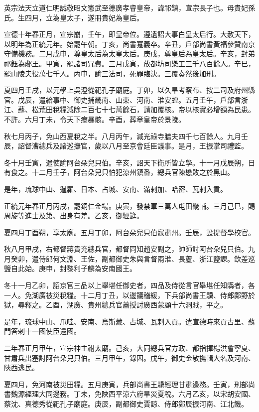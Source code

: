 
\begin{pinyinscope}
英宗法天立道仁明誠敬昭文憲武至德廣孝睿皇帝，諱祁鎮，宣宗長子也。母貴妃孫氏。生四月，立為皇太子，遂冊貴妃為皇后。

宣德十年春正月，宣宗崩，壬午，即皇帝位。遵遺詔大事白皇太后行。大赦天下，以明年為正統元年。始罷午朝。丁亥，尚書蹇義卒。辛丑，戶部尚書黃福參贊南京守備機務。二月戊申，尊皇太后為太皇太后。庚戌，尊皇后為皇太后。辛亥，封弟祁鈺為郕王。甲寅，罷諸司冗費。三月戊寅，放都坊司樂工三千八百餘人。辛巳，罷山陵夫役萬七千人。丙申，諭三法司，死罪臨決。三覆奏然後加刑。

夏四月壬戌，以元學上吳澄從祀孔子廟庭。丁卯，以久旱考察布、按二司及府州縣官。戊辰，遣給事中、御史捕畿南、山東、河南、淮安蝗。五月壬午，戶部言浙江、蘇、松荒田稅糧減除二百七十七萬餘石，請加覆核。帝以核實必增額為民患。不許。六月丁未，令天下瘞暴骸。辛酉，葬章皇帝於景陵。

秋七月丙子，免山西夏稅之半。八月丙午，減光祿寺膳夫四千七百餘人。九月壬辰，詔督漕總兵及諸巡撫官，歲以八月至京會廷臣議事。是月，王振掌司禮監。

冬十月壬寅，遣使諭阿台朵兒只伯。辛亥，詔天下衛所皆立學。十一月戊辰朔，日有食之。十二月壬子，阿台朵兒只怕犯涼州鎮番，總兵官陳懋敗之於黑山。

是年，琉球中山、暹羅、日本、占城、安南、滿剌加、哈密、瓦剌入貢。

正統元年春正月丙戌，罷銅仁金場。庚寅，發禁軍三萬人屯田畿輔。三月己巳，賜周旋等進士及第、出身有差。乙亥，御經筵。

夏四月丁酉朔，享太廟。五月丁卯，阿台朵兒只伯寇肅州。壬辰，設提督學校官。

秋八月甲戌，右都督蔣貴充總兵官，都督同知趙安副之，帥師討阿台朵兒只伯。九月癸卯，遣侍郎何文淵、王佐，副都御史朱與言督兩淮、長蘆、浙江鹽課。欽差巡鹽自此始。庚申，封黎利子麟為安南國王。

冬十一月乙卯，詔京官三品以上舉堪任御史者，四品及侍從言官舉堪任知縣者，各一人。免湖廣被災稅糧。十二月丁丑，以邊議稽緩，下兵部尚書王驥、侍郎鄺野於獄，尋釋之。乙酉，湖廣、貴州總兵官蕭授討廣西蒙顧十六洞賊，平之。

是年，琉球中山、爪哇、安南、烏斯藏、占城、瓦剌入貢。遣宣德時來貢古里、蘇門答剌十一國使臣還國。

二年春正月甲午，宣宗神主祔太廟。己亥，大同總兵官方政、都指揮楊洪會寧夏、甘肅兵出塞討阿台朵兒只伯。三月甲午，錄囚。戊午，御史金敬撫輯大名及河南、陜西逃民。

夏四月，免河南被災田糧。五月庚寅，兵部尚書王驥經理甘肅邊務。壬寅，刑部尚書魏源經理大同邊務。丁未，免陜西平涼六府旱災夏稅。六月乙亥，以宋胡安國、蔡沈、真德秀從祀孔子廟庭。庚辰，副都御史賈諒、侍郎鄭辰振河南、江北饑。


\end{pinyinscope}

